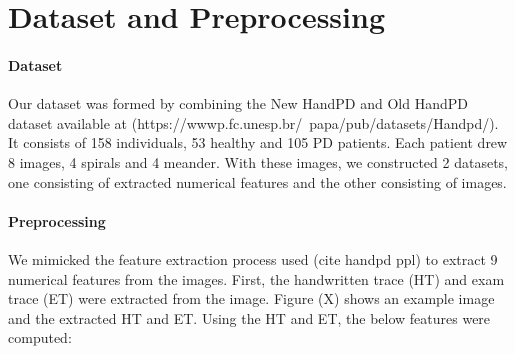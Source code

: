 \documentclass[pmlr,twocolumn,10pt]{jmlr} %
\begin{document}
\section{Dataset and Preprocessing}
\label{sec:Dataset+Preprocessing}

\paragraph{Dataset}
\label{sec:Dataset} Our dataset was formed by combining the New HandPD and Old HandPD dataset available at (https://wwwp.fc.unesp.br/~papa/pub/datasets/Handpd/). It consists of 158 individuals, 53 healthy and 105 PD patients. Each patient drew 8 images, 4 spirals and 4 meander. With these images, we constructed 2 datasets, one consisting of extracted numerical features and the other consisting of images.

\paragraph{Preprocessing}
\label{sec:Preprocessing} 
We mimicked the feature extraction process used (cite handpd ppl) to extract 9 numerical features from the images. First, the handwritten trace (HT) and exam trace (ET) were extracted from the image. Figure (X) shows an example image and the extracted HT and ET.  Using the HT and ET, the below features were computed:
\end{document}
